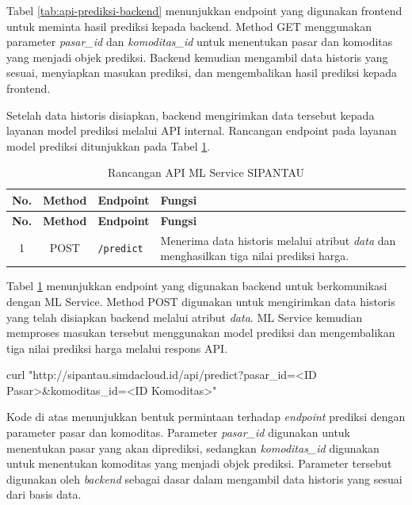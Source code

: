 Tabel \ref{tab:api-prediksi-backend} menunjukkan endpoint yang digunakan frontend untuk meminta hasil prediksi kepada backend. Method GET menggunakan parameter \textit{pasar\_id} dan \textit{komoditas\_id} untuk menentukan pasar dan komoditas yang menjadi objek prediksi. Backend kemudian mengambil data historis yang sesuai, menyiapkan masukan prediksi, dan mengembalikan hasil prediksi kepada frontend.

Setelah data historis disiapkan, backend mengirimkan data tersebut kepada layanan model prediksi melalui API internal. Rancangan endpoint pada layanan model prediksi ditunjukkan pada Tabel \ref{tab:api-ml-service}.

\begin{longtable}{|c|c|p{4cm}|p{5.2cm}|}
\caption{Rancangan API ML Service SIPANTAU}
\label{tab:api-ml-service} \\

\hline
\textbf{No.} & \textbf{Method} & \textbf{Endpoint} & \textbf{Fungsi} \\
\hline
\endfirsthead

\hline
\textbf{No.} & \textbf{Method} & \textbf{Endpoint} & \textbf{Fungsi} \\
\hline
\endhead

1 & POST & \texttt{/predict} &
Menerima data historis melalui atribut \textit{data} dan menghasilkan tiga nilai prediksi harga. \\ \hline

\end{longtable}

Tabel \ref{tab:api-ml-service} menunjukkan endpoint yang digunakan backend untuk berkomunikasi dengan ML Service. Method POST digunakan untuk mengirimkan data historis yang telah disiapkan backend melalui atribut \textit{data}. ML Service kemudian memproses masukan tersebut menggunakan model prediksi dan mengembalikan tiga nilai prediksi harga melalui respons API.

\begin{code}
\begin{ignasicblock}
curl "http://sipantau.simdacloud.id/api/predict?pasar_id=<ID Pasar>&komoditas_id=<ID Komoditas>"
\end{ignasicblock}
\end{code}

Kode di atas menunjukkan bentuk permintaan terhadap \textit{endpoint} prediksi dengan parameter pasar dan komoditas. Parameter \textit{pasar\_id} digunakan untuk menentukan pasar yang akan diprediksi, sedangkan \textit{komoditas\_id} digunakan untuk menentukan komoditas yang menjadi objek prediksi. Parameter tersebut digunakan oleh \textit{backend} sebagai dasar dalam mengambil data historis yang sesuai dari basis data.

